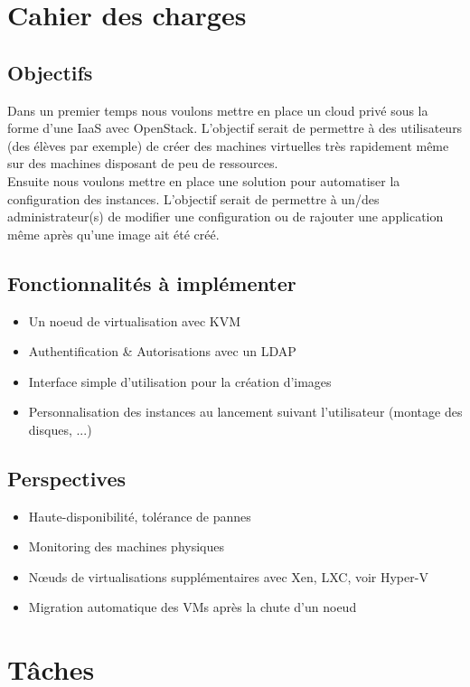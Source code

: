 \chapter{Cahier des charges}
\section{Objectifs}
Dans un premier temps nous voulons mettre en place un cloud privé sous la forme d'une IaaS avec OpenStack. L'objectif serait de permettre à des utilisateurs (des élèves par exemple) de créer des machines virtuelles très rapidement même sur des machines disposant de peu de ressources.\\

Ensuite nous voulons mettre en place une solution pour automatiser la configuration des instances. L'objectif serait de permettre à un/des administrateur(s) de modifier une configuration ou de rajouter une application même après qu'une image ait été créé.

\section{Fonctionnalités à implémenter}
\begin{itemize}
\item Un noeud de virtualisation avec KVM
\item Authentification \& Autorisations avec un LDAP
\item Interface simple d'utilisation pour la création d'images
\item Personnalisation des instances au lancement suivant l'utilisateur (montage des disques, ...)
\end{itemize}

\section{Perspectives}
\begin{itemize}
\item Haute-disponibilité, tolérance de pannes
\item Monitoring des machines physiques
\item Nœuds de virtualisations supplémentaires avec Xen, LXC, voir Hyper-V
\item Migration automatique des VMs après la chute d'un noeud
\end{itemize}
\chapter{Tâches}
